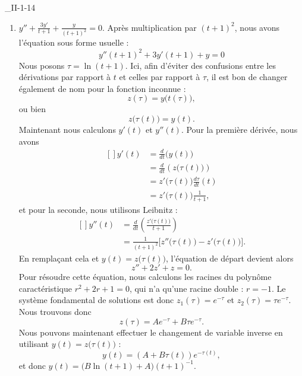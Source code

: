 \begin{corrige}{_II-1-14}

\begin{enumerate}

\item $y''+\frac{ 3y' }{ t+1 }+\frac{ y }{ (t+1)^2 }=0$.
Après multiplication par $(t+1)^2$, nous avons l'équation sous forme usuelle :
\begin{equation}	\label{EqEulerSSFormeII114}
	y''(t+1)^2+3y'(t+1)+y=0
\end{equation}
Nous posons $\tau=\ln(t+1)$. Ici, afin d'éviter des confusions entre les dérivations par rapport à $t$ et celles par rapport à $\tau$, il est bon de changer également de nom pour la fonction inconnue :
\begin{equation}
	z(\tau)=y\big( t(\tau) \big),
\end{equation}
ou bien
\begin{equation}
	z\big( \tau(t) \big)=y(t).
\end{equation}
Maintenant nous calculons $y'(t)$ et $y''(t)$. Pour la première dérivée, nous avons
\begin{equation}
	\begin{aligned}[]
	y'(t)	&=\frac{ d }{ dt }\big( y(t) \big)\\
		&=\frac{ d }{ dt }\left( z\big( \tau(t) \big) \right)\\
		&=z'\big( \tau(t) \big)\frac{ d\tau }{ dt }(t)\\
		&=z'\big( \tau(t) \big)\frac{ 1 }{ t+1 },
	\end{aligned}
\end{equation}
et pour la seconde, nous utilisons Leibnitz :
\begin{equation}
	\begin{aligned}[]
		y''(t)	&=\frac{ d }{ dt }\left( \frac{ z'\big( \tau(t) \big) }{ t+1 } \right)\\
			&=\frac{1}{ (t+1)^2 }\Big[  z''\big( \tau(t) \big)-z'\big( \tau(t) \big) \Big].
	\end{aligned}
\end{equation}
En remplaçant cela et $y(t)=z\big( \tau(t) \big)$, l'équation de départ devient alors
\begin{equation}
	z''+2z'+z=0.
\end{equation}
Pour résoudre cette équation, nous calculons les racines du polynôme caractéristique $r^2+2r+1=0$, qui n'a qu'une racine double : $r=-1$. Le système fondamental de solutions est donc $z_1(\tau)= e^{-\tau}$ et $z_2(\tau)= \tau e^{-\tau}$. Nous trouvons donc
\begin{equation}
	z(\tau)=A e^{-\tau}+B\tau e^{-\tau}.
\end{equation}
Nous pouvons maintenant effectuer le changement de variable inverse en utilisant $y(t)=z\big( \tau(t) \big)$ :
\begin{equation}
	y(t)=(A+B\tau(t)) e^{-\tau(t)},
\end{equation}
et donc $y(t)=\big( B\ln(t+1)+A \big)(t+1)^{-1}$.



\end{enumerate}
\end{corrige}
